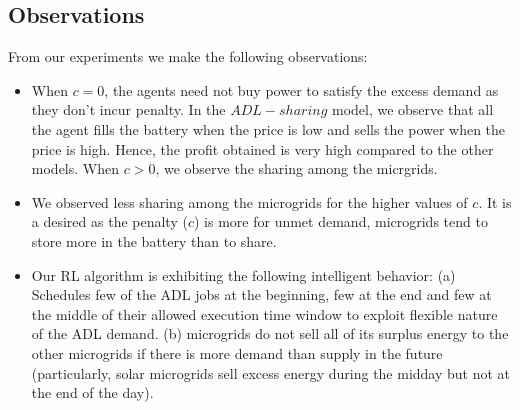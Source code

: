\subsection{Observations}
From our experiments we make the following observations:
\begin{itemize}
\item When $c = 0$, the agents need not buy power to satisfy the excess demand as they don't incur penalty.
 In the $ADL-sharing$ model, we observe that all the agent fills the battery when the price is low and sells the power when the price is high. %
Hence, the profit obtained is very high compared to the other models. When $c >0$, we observe the sharing among the micrgrids. 
\item We observed less sharing among the microgrids for the higher values of $c$. It is a desired as the penalty ($c$) is more for unmet demand, microgrids tend to store more in the battery than to share. 
	
\item Our RL algorithm is exhibiting the following intelligent behavior: (a) Schedules few of the ADL jobs at the beginning, few at the end and few at the middle of their allowed execution time window to exploit flexible nature of the ADL demand. (b) microgrids do not sell all of its surplus energy to the other microgrids if there is more demand than supply in the future (particularly, solar microgrids sell excess energy during the midday but not at the end of the day).
\end{itemize}
